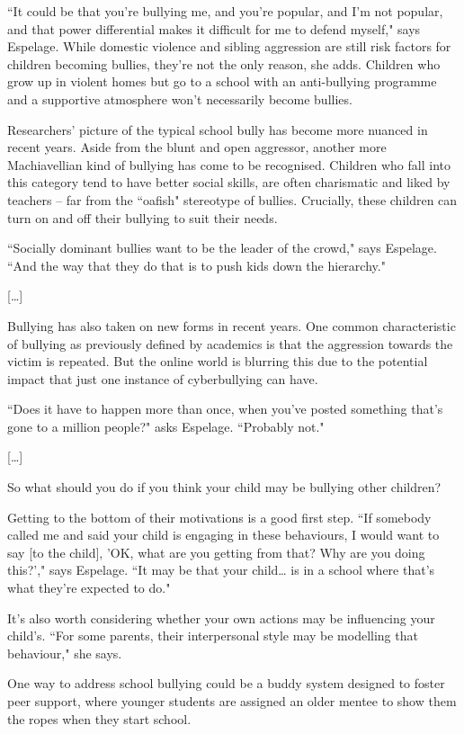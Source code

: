 \documentclass[10pt,a4paper]{article}
\newcommand{\qm}[1]{``#1"}
\begin{document}
\qm{It could be that you're bullying me, and you're popular, and I'm not popular, and that power differential makes it difficult for me to defend myself,} says Espelage. While domestic violence and sibling aggression are still risk factors for children becoming bullies, they're not the only reason, she adds. Children who grow up in violent homes but go to a school with an anti-bullying programme and a supportive atmosphere won't necessarily become bullies.

Researchers' picture of the typical school bully has become more nuanced in recent years. Aside from the blunt and open aggressor, another more Machiavellian kind of bullying has come to be recognised. Children who fall into this category tend to have better social skills, are often charismatic and liked by teachers -- far from the \qm{oafish} stereotype of bullies. Crucially, these children can turn on and off their bullying to suit their needs.

\qm{Socially dominant bullies want to be the leader of the crowd,} says Espelage. \qm{And the way that they do that is to push kids down the hierarchy.}

[\ldots]

Bullying has also taken on new forms in recent years. One common characteristic of bullying as previously defined by academics is that the aggression towards the victim is repeated. But the online world is blurring this due to the potential impact that just one instance of cyberbullying can have.

\qm{Does it have to happen more than once, when you've posted something that's gone to a million people?} asks Espelage. \qm{Probably not.}

[\ldots]

So what should you do if you think your child may be bullying other children?

Getting to the bottom of their motivations is a good first step. \qm{If somebody called me and said your child is engaging in these behaviours, I would want to say [to the child], 'OK, what are you getting from that? Why are you doing this?',} says Espelage. \qm{It may be that your child\ldots{} is in a school where that's what they're expected to do.}

It's also worth considering whether your own actions may be influencing your child's. \qm{For some parents, their interpersonal style may be modelling that behaviour,} she says.

One way to address school bullying could be a buddy system designed to foster peer support, where younger students are assigned an older mentee to show them the ropes when they start school.
\end{document}

